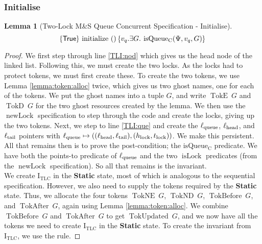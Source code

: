 \documentclass[a4paper, 10pt]{report}
\theoremstyle{definition}
\newtheorem{lemma}[theorem]{Lemma}
\newcommand{\isLock}{\operatorname{isLock}}
\newcommand{\newLock}{\operatorname{newLock}}
\newcommand{\initialise}{\operatorname{initialize}}
\newcommand{\msq}{M\&S Queue}
\newcommand{\tlmsq}{Two-Lock \msq{}}
\newcommand{\isqueueconc}{\operatorname{isQueue_{C}}}
\newcommand{\TLQueueInvariantConc}{\operatorname{I_{TLC}}}
\newcommand{\vq}{v_q}
\newcommand{\locN}[1]{\loc_{\mathrm{#1}}}
\newcommand{\lochead}{\locN{head}}
\newcommand{\loctail}{\locN{tail}}
\newcommand{\locqueue}{\locN{queue}}
\newcommand{\Hlock}{h_{\mathrm{lock}}}
\newcommand{\Tlock}{t_{\mathrm{lock}}}
\newcommand{\StaticState}{\textbf{Static}\xspace}
\newcommand{\Qg}{G}
\newcommand{\TokE}[1]{\operatorname{TokE} ~ #1}
\newcommand{\TokEQg}{\TokE{\Qg}}
\newcommand{\TokNE}[1]{\operatorname{TokNE} ~ #1}
\newcommand{\TokNEQg}{\TokNE{\Qg}}
\newcommand{\TokD}[1]{\operatorname{TokD} ~ #1}
\newcommand{\TokDQg}{\TokD{\Qg}}
\newcommand{\TokND}[1]{\operatorname{TokND} ~ #1}
\newcommand{\TokNDQg}{\TokND{\Qg}}
\newcommand{\TokBefore}[1]{\operatorname{TokBefore} ~ #1}
\newcommand{\TokBeforeQg}{\TokBefore{\Qg}}
\newcommand{\TokAfter}[1]{\operatorname{TokAfter} ~ #1}
\newcommand{\TokAfterQg}{\TokAfter{\Qg}}
\newcommand{\TokUpdated}[1]{\operatorname{TokUpdated} ~ #1}
\newcommand{\TokUpdatedQg}{\TokUpdated{\Qg}}
\newcommand{\concspecinitHTGen}[3]{\hoare{\TRUE}{\initialise \ \TT}{#2 . \Exists #3. \isqueueconc(#1, #2, #3)}}
\newcommand{\concspecinitGen}[3]{\concspecinitHTGen{#1}{#2}{#3}}
\newcommand{\concspecinit}[1]{\concspecinitGen{#1}{\vq}{\Qg}}
\begin{document}
\subsubsection{Initialise}
\begin{lemma}[\tlmsq{} Concurrent Specification - Initialise]\label{TLMSQ:spec:conc:init}
  \begin{equation*}
    \concspecinit{\Psi}
  \end{equation*}
\end{lemma}
\begin{proof}
We first step through line \ref{TLI:nod} which gives us the head node of the linked list. Following this, we must create the two locks. As the locks had to protect tokens, we must first create these. To create the two tokens, we use Lemma \ref{lemma:token:alloc} twice, which gives us two ghost names, one for each of the tokens. We put the ghost names into a tuple $\Qg$, and write $\TokEQg$ and $\TokDQg$ for the two ghost resources created by the lemma. We then use the $\newLock$ specification to step through the code and create the locks, giving up the two tokens. Next, we step to line \ref{TLI:que} and create the $\locqueue$, $\lochead$, and $\loctail$ pointers with $\locqueue \mapsto ((\lochead, \loctail), (\Hlock, \Tlock))$. We make this persistent.\\
All that remains then is to prove the post-condition; the $\isqueueconc$ predicate. We have both the points-to predicate of $\locqueue$ and the two $\isLock$ predicates (from the $\newLock$ specification). So all that remains is the invariant.\\
We create $\TLQueueInvariantConc$ in the \StaticState state, most of which is analogous to the sequential specification. However, we also need to supply the tokens required by the \StaticState state. Thus, we allocate the four tokens $\TokNEQg$, $\TokNDQg$, $\TokBeforeQg$, and $\TokAfterQg$, again using Lemma \ref{lemma:token:alloc}. We combine $\TokBeforeQg$ and $\TokAfterQg$ to get $\TokUpdatedQg$, and we now have all the tokens we need to create $\TLQueueInvariantConc$ in the \StaticState state. To create the invariant from $\TLQueueInvariantConc$, we use the  rule.
\end{proof}
\end{document}
